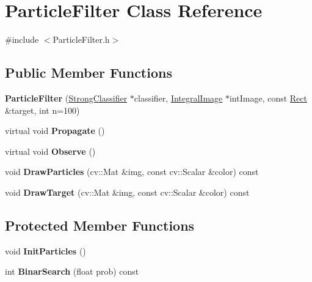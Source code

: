 \hypertarget{classParticleFilter}{}\section{Particle\+Filter Class Reference}
\label{classParticleFilter}


{\ttfamily \#include $<$Particle\+Filter.\+h$>$}

\subsection*{Public Member Functions}
\begin{DoxyCompactItemize}
\item 
\hypertarget{classParticleFilter_a35a9c63314a651517636b607b93905a3}{}{\bfseries Particle\+Filter} (\hyperlink{classStrongClassifier}{Strong\+Classifier} $\ast$classifier, \hyperlink{classIntegralImage}{Integral\+Image} $\ast$int\+Image, const \hyperlink{classRect}{Rect} \&target, int n=100)\label{classParticleFilter_a35a9c63314a651517636b607b93905a3}

\item 
\hypertarget{classParticleFilter_a7696b97b667be113891f929d70c74393}{}virtual void {\bfseries Propagate} ()\label{classParticleFilter_a7696b97b667be113891f929d70c74393}

\item 
\hypertarget{classParticleFilter_a2eb32a3720985e474999ccb5f69bc079}{}virtual void {\bfseries Observe} ()\label{classParticleFilter_a2eb32a3720985e474999ccb5f69bc079}

\item 
\hypertarget{classParticleFilter_a666ab9bee3ed479c5e9387f8d5908e48}{}void {\bfseries Draw\+Particles} (cv\+::\+Mat \&img, const cv\+::\+Scalar \&color) const \label{classParticleFilter_a666ab9bee3ed479c5e9387f8d5908e48}

\item 
\hypertarget{classParticleFilter_ace5259baa39baccc26212d9ed116cf7c}{}void {\bfseries Draw\+Target} (cv\+::\+Mat \&img, const cv\+::\+Scalar \&color) const \label{classParticleFilter_ace5259baa39baccc26212d9ed116cf7c}

\end{DoxyCompactItemize}
\subsection*{Protected Member Functions}
\begin{DoxyCompactItemize}
\item 
\hypertarget{classParticleFilter_a0244f4fb69b92deb70aa470f2cc85ca4}{}void {\bfseries Init\+Particles} ()\label{classParticleFilter_a0244f4fb69b92deb70aa470f2cc85ca4}

\item 
\hypertarget{classParticleFilter_a566b57dbca5caadbf1c9dce31b3407be}{}int {\bfseries Binar\+Search} (float prob) const \label{classParticleFilter_a566b57dbca5caadbf1c9dce31b3407be}

\end{DoxyCompactItemize}
